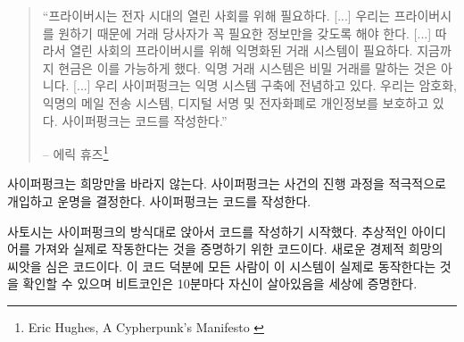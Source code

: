 \begin{quotation}\begin{samepage}
\begin{comment}
\enquote{Privacy is necessary for an open society in the electronic age.
[...] Since we desire privacy, we must ensure that each party to a
transaction have knowledge only of that which is directly necessary
for that transaction. [...]
Therefore, privacy in an open society requires anonymous transaction
systems. Until now, cash has been the primary such system. An
anonymous transaction system is not a secret transaction system.
[...]
We the Cypherpunks are dedicated to building anonymous systems. We are
defending our privacy with cryptography, with anonymous mail
forwarding systems, with digital signatures, and with electronic
money.
Cypherpunks write code.}
\end{comment}
\enquote{프라이버시는 전자 시대의 열린 사회를 위해 필요하다. [...]
우리는 프라이버시를 원하기 때문에 거래 당사자가 꼭 필요한 정보만을 갖도록 해야 한다. [...]
따라서 열린 사회의 프라이버시를 위해 익명화된 거래 시스템이 필요하다.
지금까지 현금은 이를 가능하게 했다. 익명 거래 시스템은 비밀 거래를 말하는 것은 아니다. [...]
우리 사이퍼펑크는 익명 시스템 구축에 전념하고 있다.
우리는 암호화, 익명의 메일 전송 시스템, 디지털 서명 및 전자화폐로 개인정보를 보호하고 있다.
사이퍼펑크는 코드를 작성한다.}
\begin{flushright} -- 에릭 휴즈\footnote{Eric Hughes, A Cypherpunk's Manifesto \cite{cypherpunk-manifesto}}
\end{flushright}\end{samepage}\end{quotation}

\begin{comment}
Cypherpunks do not find comfort in hopes and wishes. They actively
interfere with the course of events and shape their own destiny.
Cypherpunks write code.
\end{comment}
사이퍼펑크는 희망만을 바라지 않는다.
사이퍼펑크는 사건의 진행 과정을 적극적으로 개입하고 운명을 결정한다.
사이퍼펑크는 코드를 작성한다.

\begin{comment}
Thus, in true cypherpunk fashion, Satoshi sat down and started to write
code. Code which took an abstract idea and proved to the world that it
actually worked. Code which planted the seed of a new economic reality.
Thanks to this code, everyone can verify that this novel system actually
works, and every 10 minutes or so Bitcoin proofs to the world that it is
still living.
\end{comment}
사토시는 사이퍼펑크의 방식대로 앉아서 코드를 작성하기 시작했다.
추상적인 아이디어를 가져와 실제로 작동한다는 것을 증명하기 위한 코드이다.
새로운 경제적 희망의 씨앗을 심은 코드이다.
이 코드 덕분에 모든 사람이 이 시스템이 실제로 동작한다는 것을 확인할 수 있으며
비트코인은 10분마다 자신이 살아있음을 세상에 증명한다.

